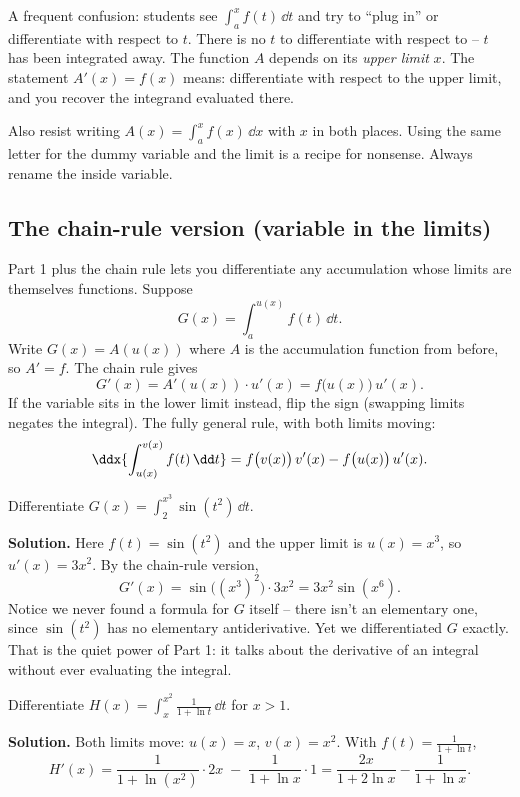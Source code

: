 \begin{trapbox}
A frequent confusion: students see $\int_a^x f(t)\,\dd t$ and try to ``plug in''
or differentiate with respect to $t$. There is no $t$ to differentiate with
respect to -- $t$ has been integrated away. The function $A$ depends on its
\emph{upper limit} $x$. The statement $A'(x)=f(x)$ means: differentiate with
respect to the upper limit, and you recover the integrand evaluated there.

Also resist writing $A(x)=\int_a^x f(x)\,\dd x$ with $x$ in both places. Using
the same letter for the dummy variable and the limit is a recipe for nonsense.
Always rename the inside variable.
\end{trapbox}

\subsection{The chain-rule version (variable in the limits)}

Part 1 plus the chain rule lets you differentiate any accumulation whose limits
are themselves functions. Suppose
\[
  G(x) = \int_a^{u(x)} f(t)\,\dd t .
\]
Write $G(x)=A(u(x))$ where $A$ is the accumulation function from before, so
$A'=f$. The chain rule gives
\[
  G'(x) = A'(u(x))\cdot u'(x) = f\big(u(x)\big)\, u'(x).
\]
If the variable sits in the lower limit instead, flip the sign (swapping limits
negates the integral). The fully general rule, with both limits moving:
\[
  \ddx{\int_{u(x)}^{v(x)} f(t)\,\dd t}
  = f\big(v(x)\big)\,v'(x) - f\big(u(x)\big)\,u'(x).
\]

\begin{example}\label{ch21:ex-chain}
Differentiate $\displaystyle G(x)=\int_2^{x^3}\sin(t^2)\,\dd t$.

\textbf{Solution.} Here $f(t)=\sin(t^2)$ and the upper limit is $u(x)=x^3$, so
$u'(x)=3x^2$. By the chain-rule version,
\[
  G'(x) = \sin\big((x^3)^2\big)\cdot 3x^2 = 3x^2\sin(x^6).
\]
Notice we never found a formula for $G$ itself -- there isn't an elementary one,
since $\sin(t^2)$ has no elementary antiderivative. Yet we differentiated $G$
exactly. That is the quiet power of Part 1: it talks about the derivative of an
integral without ever evaluating the integral.
\end{example}

\begin{example}\label{ch21:ex-chain2}
Differentiate $\displaystyle H(x)=\int_{x}^{x^2}\frac{1}{1+\ln t}\,\dd t$ for
$x>1$.

\textbf{Solution.} Both limits move: $u(x)=x$, $v(x)=x^2$. With
$f(t)=\frac{1}{1+\ln t}$,
\[
  H'(x) = \frac{1}{1+\ln(x^2)}\cdot 2x \;-\; \frac{1}{1+\ln x}\cdot 1
        = \frac{2x}{1+2\ln x} - \frac{1}{1+\ln x}.
\]
\end{example}

